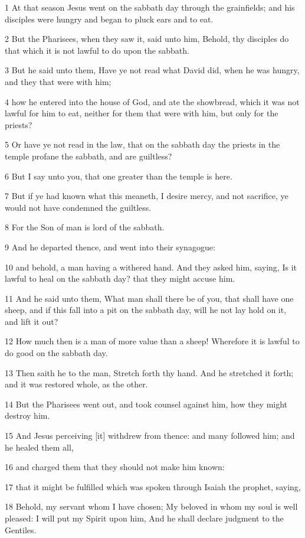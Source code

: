 \par 1 At that season Jesus went on the sabbath day through the grainfields; and his disciples were hungry and began to pluck ears and to eat.
\par 2 But the Pharisees, when they saw it, said unto him, Behold, thy disciples do that which it is not lawful to do upon the sabbath.
\par 3 But he said unto them, Have ye not read what David did, when he was hungry, and they that were with him;
\par 4 how he entered into the house of God, and ate the showbread, which it was not lawful for him to eat, neither for them that were with him, but only for the priests?
\par 5 Or have ye not read in the law, that on the sabbath day the priests in the temple profane the sabbath, and are guiltless?
\par 6 But I say unto you, that one greater than the temple is here.
\par 7 But if ye had known what this meaneth, I desire mercy, and not sacrifice, ye would not have condemned the guiltless.
\par 8 For the Son of man is lord of the sabbath.
\par 9 And he departed thence, and went into their synagogue:
\par 10 and behold, a man having a withered hand. And they asked him, saying, Is it lawful to heal on the sabbath day? that they might accuse him.
\par 11 And he said unto them, What man shall there be of you, that shall have one sheep, and if this fall into a pit on the sabbath day, will he not lay hold on it, and lift it out?
\par 12 How much then is a man of more value than a sheep! Wherefore it is lawful to do good on the sabbath day.
\par 13 Then saith he to the man, Stretch forth thy hand. And he stretched it forth; and it was restored whole, as the other.
\par 14 But the Pharisees went out, and took counsel against him, how they might destroy him.
\par 15 And Jesus perceiving [it] withdrew from thence: and many followed him; and he healed them all,
\par 16 and charged them that they should not make him known:
\par 17 that it might be fulfilled which was spoken through Isaiah the prophet, saying,
\par 18 Behold, my servant whom I have chosen; My beloved in whom my soul is well pleased: I will put my Spirit upon him, And he shall declare judgment to the Gentiles.
